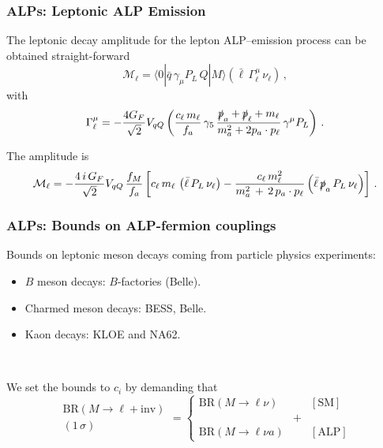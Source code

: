 \documentclass[mathserif, 10pt]{beamer}
\begin{document}
\begin{frame}\frametitle{ALPs: Leptonic ALP Emission}
    The leptonic decay amplitude for the lepton ALP--emission process can be obtained straight-forward
    $$ \mathcal{M}_\ell =  \langle 0|\bar{q}\,\gamma_\mu  P_L\,Q |M\rangle \left(\bar{\ell} \,\Gamma^\mu_\ell \,\nu_\ell \right) \,,
    $$
    with
    $$
        \Gamma^\mu_\ell = - \frac{4 G_F}{\sqrt{2}} V_{qQ}
        \left(\frac{c_\ell\,m_\ell}{f_a}\,\gamma_5\,\frac{\slashed{p}_a+\slashed{p}_\ell+m_\ell}{m_a^2 + 2 p_a \cdot p_\ell}\,\gamma^\mu P_L \right)\,.$$

    The amplitude is
    $$\mathcal{M}_\ell = - \frac{4\,i\, G_F}{\sqrt{2}} V_{qQ} \,\frac{f_M}{f_a}  \left[  c_\ell\,m_\ell\, \left(\bar{\ell} \, P_L \,\nu_\ell \right) -
            \frac{ c_\ell \, m^2_\ell}{m_a^2\,+\, 2\,p_a\cdot p_\ell} \left(\bar{\ell} \, \slashed{p}_a\, P_L \,\nu_\ell \right) \right] \,.$$
\end{frame}

\begin{frame} \frametitle{ALPs: Bounds on ALP-fermion couplings}
    Bounds on leptonic meson decays coming from particle physics experiments:
    \begin{itemize}
        \item $B$ meson decays: $B$-factories (Belle).
        \item Charmed meson decays: BESS, Belle.
        \item Kaon decays: KLOE and NA62.
    \end{itemize}

    ~

    We set the bounds to $c_i$ by demanding that
    $$
        \begin{matrix}
            \mathrm{BR}(M\to \ell + \mathrm{inv}) \\
            (1\,\sigma)
        \end{matrix} = \left\{ \begin{matrix}
            \mathrm{BR}(M\to \ell \nu)   &   & [\mathrm{SM}]  \\
                                         & + &                \\
            \mathrm{BR}(M\to \ell \nu a) &   & [\mathrm{ALP}]
        \end{matrix} \right.
    $$

\end{frame}
\end{document}
